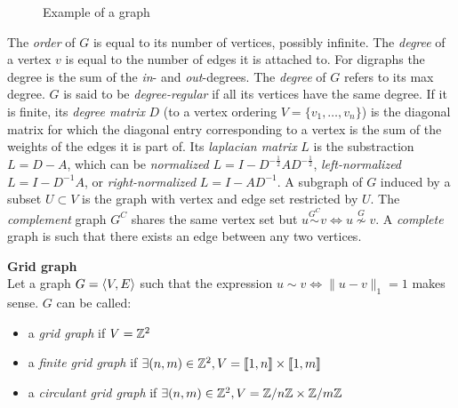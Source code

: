 \begin{figure}[h!tp]
\centering
{}
\caption{Example of a graph}
\label{fig:graph}
\end{figure}

The \emph{order} of $G$ is equal to its number of vertices, possibly infinite.
The \emph{degree} of a vertex $v$ is equal to the number of edges it is attached to.
For digraphs the degree is the sum of the \emph{in}- and \emph{out}-degrees.
The \emph{degree} of $G$ refers to its max degree.
$G$ is said to be \emph{degree-regular} if all its vertices have the same degree.
If it is finite, its \emph{degree matrix} $D$ (\wrt to a vertex ordering $V = \{v_1, \ldots, v_n\}$) is the diagonal matrix for which the diagonal entry corresponding to a vertex is the sum of the weights of the edges it is part of.
Its \emph{laplacian matrix} $L$ is the substraction $L = D-A$, which can be \emph{normalized} $L = I - D^{-\frac{1}2}AD^{-\frac{1}2}$, \emph{left-normalized} $L = I - D^{-1}A$, or \emph{right-normalized} $L = I - AD^{-1}$.
A subgraph of $G$ induced by a subset $U \subset V$ is the graph with vertex and edge set restricted by $U$. The \emph{complement} graph $G^C$ shares the same vertex set but $u \overset{G^C}\sim v \Leftrightarrow u \overset{G}\nsim v$.
A \emph{complete} graph is such that there exists an edge between any two vertices.

\begin{definition}\textbf{Grid graph}\\
Let a graph $G = \langle V, E \rangle$ such that the expression $u \sim v \Leftrightarrow \|u-v\|_1 = 1$ makes sense. $G$ can be called:
\begin{itemize}[nolistsep,noitemsep]
\item a \emph{grid graph} if $V = \mathbb{Z}^2$
\item a \emph{finite grid graph} if $\exists (n,m) \in \mathbb{Z}^2, V = \llbracket 1, n \rrbracket \times \llbracket 1, m \rrbracket$
\item a \emph{circulant grid graph} if $\exists (n,m) \in \mathbb{Z}^2, V = \mathbb{Z} /n \mathbb{Z} \times \mathbb{Z} /m \mathbb{Z}$
\end{itemize}
\end{definition}


